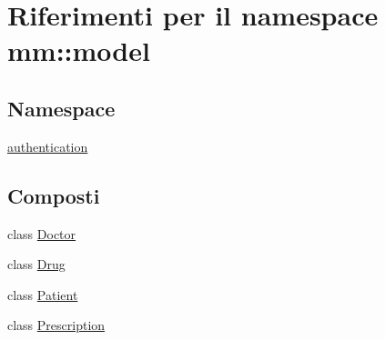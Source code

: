 \hypertarget{namespacemm_1_1model}{}\section{Riferimenti per il namespace mm\+:\+:model}
\label{namespacemm_1_1model}
\subsection*{Namespace}
\begin{DoxyCompactItemize}
\item 
 \hyperlink{namespacemm_1_1model_1_1authentication}{authentication}
\end{DoxyCompactItemize}
\subsection*{Composti}
\begin{DoxyCompactItemize}
\item 
class \hyperlink{classmm_1_1model_1_1_doctor}{Doctor}
\item 
class \hyperlink{classmm_1_1model_1_1_drug}{Drug}
\item 
class \hyperlink{classmm_1_1model_1_1_patient}{Patient}
\item 
class \hyperlink{classmm_1_1model_1_1_prescription}{Prescription}
\end{DoxyCompactItemize}
